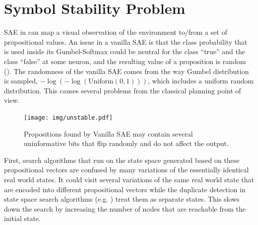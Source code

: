 

\section{Symbol Stability Problem}
\label{issues}

SAE in \latentplanner can map a visual observation of the environment to/from a set of propositional values.
An issue in a vanilla SAE is that the class probability that is used inside its Gumbel-Softmax could be
neutral for the class ``true'' and the class ``false'' at some neuron, and the resulting value
of a proposition is random ().
The randomness of the vanilla SAE comes from the way
Gumbel distribution is sampled, $-\log (-\log (\text{Uniform}(0,1)))$, which includes
a uniform random distribution.
This causes several problems from the classical planning point of view.

\begin{figure}[htb]
 \centering
 \texttt{[image: img/unstable.pdf]}
 \caption{Propositions found by Vanilla SAE may contain several uninformative bits
 that flip randomly and do not affect the output.}
 \label{unstable}
\end{figure}

First, search algorithms that run on the state space generated based on these propositional vectors
are confused by many variations of the essentially identical real world states.
It could visit several variations of the same real world state that are encoded into different propositional vectors
while the duplicate detection in state space search algorithms (e.g. \astar) treat them as separate states.
This slows down the search by increasing the number of nodes that are reachable from the initial state.

